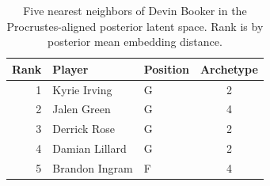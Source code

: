 \begin{table}[htbp]
  \centering\small
  \begin{tabular}{rllc}
    \toprule
    Rank & Player & Position & Archetype \\
    \midrule
    1 & Kyrie Irving & G & 2 \\
    2 & Jalen Green & G & 4 \\
    3 & Derrick Rose & G & 2 \\
    4 & Damian Lillard & G & 2 \\
    5 & Brandon Ingram & F & 4 \\
    \bottomrule
  \end{tabular}
  \caption{Five nearest neighbors of Devin Booker in the Procrustes-aligned posterior latent space. Rank is by posterior mean embedding distance.}
  \label{tab:Devin_Booker_neighbors}
\end{table}

